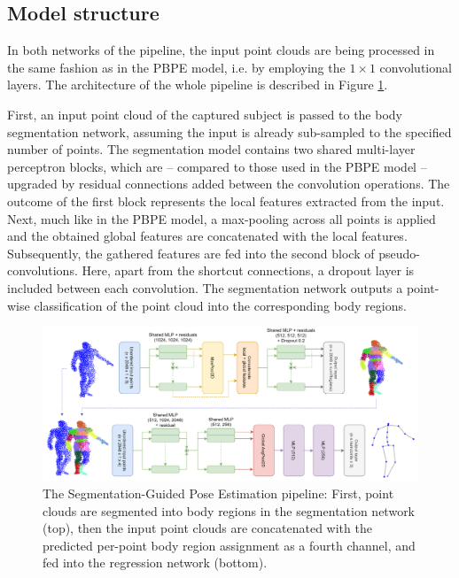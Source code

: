 \subsection{Model structure}
In both networks of the pipeline, the input point clouds are being processed in the same fashion as in the PBPE model, i.e. by employing the $1 \times 1$ convolutional layers. The architecture of the whole pipeline is described in Figure \ref{fig:4chan_pipeline}.\par
\vspace{5mm}
\noindent First, an input point cloud of the captured subject is passed to the body segmentation network, assuming the input is already sub-sampled to the specified number of points. The segmentation model contains two shared multi-layer perceptron blocks, which are – compared to those used in the PBPE model – upgraded by residual connections added between the convolution operations. The outcome of the first block represents the local features extracted from the input. Next, much like in the PBPE model, a max-pooling across all points is applied and the obtained global features are concatenated with the local features. Subsequently, the gathered features are fed into the second block of pseudo-convolutions. Here, apart from the shortcut connections, a dropout layer is included between each convolution. The segmentation network outputs a point-wise classification of the point cloud into the corresponding body regions.\par
\vspace{5mm}
\vspace{5mm}
\begin{figure}[H]
\begin{center}
  \includegraphics[width=\textwidth]{images/implementation/4chan_pipeline_mine2.png}
  \caption[The Segmentation-Guided Pose Estimation pipeline.]{ The Segmentation-Guided Pose Estimation pipeline: First, point clouds are segmented into body regions in the segmentation network (top), then the input point clouds are concatenated with the predicted per-point body region assignment as a fourth channel, and fed into the regression network (bottom).}
  \label{fig:4chan_pipeline}
\end{center}
\end{figure}

